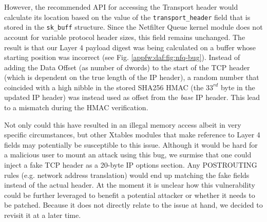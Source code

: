 However, the recommended API for accessing the Transport header would calculate its location based on the value of the \texttt{transport\_header} field that is stored in the \texttt{sk\_buff} structure. Since the Netfilter Queue kernel module does not account for variable protocol header sizes, this field remains unchanged. The result is that our Layer 4 payload digest was being calculated on a buffer whose starting position was incorrect (see Fig. \ref{appfw:daf:fig:nfq-bug}). Instead of adding the Data Offset (as number of dwords) to the start of the TCP header (which is dependent on the true length of the IP header), a random number that coincided with a high nibble in the stored SHA256 HMAC (the $33^{rd}$ byte in the updated IP header) was instead used as offset from the \textit{base} IP header. This lead to a mismatch during the HMAC verification.

Not only could this have resulted in an illegal memory access albeit in very specific circumstances, but other Xtables modules that make reference to Layer 4 fields may potentially be susceptible to this issue. Although it would be hard for a malicious user to mount an attack using this bug, we surmise that one could inject a fake TCP header as a 20-byte IP options section. Any POSTROUTING rules (e.g. network address translation) would end up matching the fake fields instead of the actual header. At the moment it is unclear how this vulnerability could be further leveraged to benefit a potential attacker or whether it needs to be patched. Because it does not directly relate to the issue at hand, we decided to revisit it at a later time.

